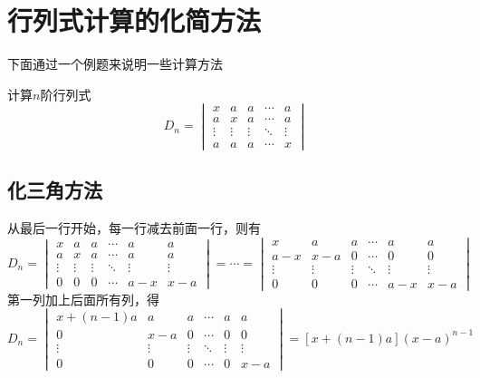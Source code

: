 \section{行列式计算的化简方法}
下面通过一个例题来说明一些计算方法
\begin{example}
    计算$n$阶行列式
    \[
        D_n =
        \begin{vmatrix}
            x      & a      & a      & \cdots & a      \\
            a      & x      & a      & \cdots & a      \\
            \vdots & \vdots & \vdots & \ddots & \vdots \\
            a      & a      & a      & \cdots & x
        \end{vmatrix}
    \]
\end{example}
\subsection{化三角方法}
\begin{solution}
    从最后一行开始，每一行减去前面一行，则有
    \[
        D_n =
        \begin{vmatrix}
            x      & a      & a      & \cdots & a      & a      \\
            a      & x      & a      & \cdots & a      & a      \\
            \vdots & \vdots & \vdots & \ddots & \vdots & \vdots \\
            0      & 0      & 0      & \cdots & a-x    & x-a
        \end{vmatrix}
        =
        \cdots
        =
        \begin{vmatrix}
            x      & a      & a      & \cdots & a      & a      \\
            a-x    & x-a    & 0      & \cdots & 0      & 0      \\
            \vdots & \vdots & \vdots & \ddots & \vdots & \vdots \\
            0      & 0      & 0      & \cdots & a-x    & x-a
        \end{vmatrix}
    \]
    第一列加上后面所有列，得
    \[
        D_n =
        \begin{vmatrix}
            x + (n-1)a & a      & a      & \cdots & a      & a      \\
            0          & x-a    & 0      & \cdots & 0      & 0      \\
            \vdots     & \vdots & \vdots & \ddots & \vdots & \vdots \\
            0          & 0      & 0      & \cdots & 0      & x-a
        \end{vmatrix}
        =
        [x+(n-1)a](x-a)^{n-1}
    \]
\end{solution}
